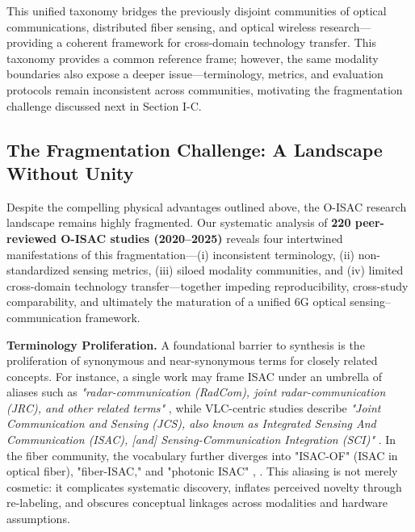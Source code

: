 This unified taxonomy bridges the previously disjoint communities of optical communications, distributed fiber sensing, and optical wireless research---providing a coherent framework for cross-domain technology transfer. This taxonomy provides a common reference frame; however, the same modality boundaries also expose a deeper issue---terminology, metrics, and evaluation protocols remain inconsistent across communities, motivating the fragmentation challenge discussed next in Section I-C.

\subsection{The Fragmentation Challenge: A Landscape Without Unity}

Despite the compelling physical advantages outlined above, the O-ISAC research landscape remains highly fragmented. Our systematic analysis of \textbf{220 peer-reviewed O-ISAC studies (2020--2025)} reveals four intertwined manifestations of this fragmentation---(i) inconsistent terminology, (ii) non-standardized sensing metrics, (iii) siloed modality communities, and (iv) limited cross-domain technology transfer---together impeding reproducibility, cross-study comparability, and ultimately the maturation of a unified 6G optical sensing--communication framework.

\textbf{Terminology Proliferation.} A foundational barrier to synthesis is the proliferation of synonymous and near-synonymous terms for closely related concepts. For instance, a single work may frame ISAC under an umbrella of aliases such as \textit{"radar-communication (RadCom), joint radar-communication (JRC), and other related terms"} \cite{O_ISAC_161}, while VLC-centric studies describe \textit{"Joint Communication and Sensing (JCS), also known as Integrated Sensing And Communication (ISAC), [and] Sensing-Communication Integration (SCI)"} \cite{O_ISAC_068}. In the fiber community, the vocabulary further diverges into "ISAC-OF" (ISAC in optical fiber), "fiber-ISAC," and "photonic ISAC" \cite{O_ISAC_041}, \cite{O_ISAC_033}. This aliasing is not merely cosmetic: it complicates systematic discovery, inflates perceived novelty through re-labeling, and obscures conceptual linkages across modalities and hardware assumptions.

